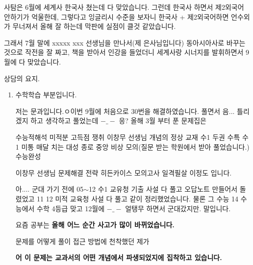     사탐은 6월에 세계사 한국사 쳤는데 다 맞았습니다.
    그런데 한국사 하면서 제2외국어 안하기가 억울한데, 그렇다고 잉글리시 수준을 보자니
    한국사 + 제2외국어하면 언수외가 무너져서 올해 잘 하는데 막판에 실점이 클것 같았습니다.
    \vspace{5mm}

    그래서 7월 말에 xxxxx xxx 선생님을 만나서(제 은사님입니다)
    동아시아사로 바꾸는 것으로 작전을 잘 짜고, 책을 받아서 인강을 들었더니
    세계사랑 시너지를 발휘하면서 9월에 다 맞았습니다.
    \vspace{5mm}
        
    상담의 요지.
    \vspace{5mm}

    \begin{enumerate}
        \item 수학학습 부분입니다.
        \vspace{5mm}

        저는 문과입니다.ㅇ이번 9월에 처음으로 30번을 해결하였습니다.
        풀면서 음... 틀리겠지 하고 생각하고 풀었는데 $-\_-$ 응?
        올해 3월 부터 푼 문제집은
        \vspace{5mm}

        수능적해석 미적분 고득점 쟁취
        이창무 선생님 개념의 정상 교재 수1 두권
        수특 수1 미통
        매달 치는  대성 종로 중앙 비상 모의(질문 받는 학원에서 받아 풀었습니다.)
        수능완성
        \vspace{5mm}

        이창무 선생님 문제해결 전략
        히든카이스 모의고사
        일격필살 이정도 입니다.
        \vspace{5mm}

        아.... 군대 가기 전에
        05$\sim$12 수1 교유청 기출 사설 다 풀고 오답노트 만들어서 돌렸었고
        11 12 미적 교육청 사설 다 풀고 같이 정리했었습니다.
        물론 그 수능 14 수능에서 수학 4등급 맞고 12월에 $-\_-$ 얼탱무 하면서 군대갔지만. 말입니다.
        \vspace{5mm}

        요즘 공부는
        \textbf{올해 어느 순간 사고가 많이 바뀌었습니다.}
        \vspace{5mm}

        문제를 어떻게 풀이 접근 방법에 천착했던 제가
        \vspace{5mm}

        \textbf{어 이 문제는 교과서의 어떤 개념에서 파생되었지에 집착하고 있습니다.}
        \vspace{5mm}


\end{enumerate}
